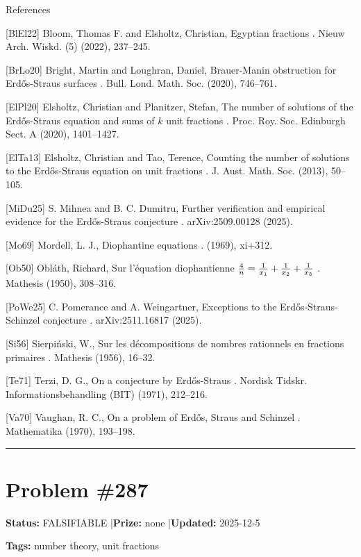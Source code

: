 \documentclass{article}
\begin{document}
References

[BlEl22] Bloom, Thomas F. and Elsholtz, Christian, Egyptian fractions . Nieuw Arch. Wiskd. (5) (2022), 237--245.

[BrLo20] Bright, Martin and Loughran, Daniel, Brauer-{M}anin obstruction for {E}rd\H os-Straus surfaces . Bull. Lond. Math. Soc. (2020), 746--761.

[ElPl20] Elsholtz, Christian and Planitzer, Stefan, The number of solutions of the {E}rd\H os-Straus equation and sums of {$k$} unit fractions . Proc. Roy. Soc. Edinburgh Sect. A (2020), 1401--1427.

[ElTa13] Elsholtz, Christian and Tao, Terence, Counting the number of solutions to the {E}rd\H os-Straus equation on unit fractions . J. Aust. Math. Soc. (2013), 50--105.

[MiDu25] S. Mihnea and B. C. Dumitru, Further verification and empirical evidence for the Erd\H{o}s-Straus conjecture . arXiv:2509.00128 (2025).

[Mo69] Mordell, L. J., Diophantine equations . (1969), xi+312.

[Ob50] Obl\'{a}th, Richard, Sur l'\'equation diophantienne {$\frac 4n=\frac1{x_1}+\frac 1{x\sb 2}+\frac 1{x_3}$} . Mathesis (1950), 308--316.

[PoWe25] C. Pomerance and A. Weingartner, Exceptions to the Erd\H{o}s-Straus-Schinzel conjecture . arXiv:2511.16817 (2025).

[Si56] Sierpi\'nski, W., Sur les d\'ecompositions de nombres rationnels en fractions primaires . Mathesis (1956), 16--32.

[Te71] Terzi, D. G., On a conjecture by {E}rd\H os-Straus . Nordisk Tidskr. Informationsbehandling (BIT) (1971), 212--216.

[Va70] Vaughan, R. C., On a problem of {E}rd\H os, Straus and Schinzel . Mathematika (1970), 193--198.

\noindent\rule{\linewidth}{0.4pt}


\section{Problem \#287}
\label{prob:287}

\noindent\textbf{Status:} FALSIFIABLE \quad|\quad \textbf{Prize:} none \quad|\quad \textbf{Updated:} 2025-12-5

\noindent\textbf{Tags:} number theory, unit fractions

\medskip
\end{document}
